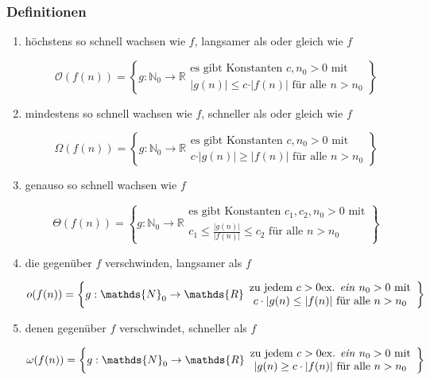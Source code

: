\documentclass{scrartcl}
\begin{document}
\subsubsection{Definitionen}
\begin{enumerate}
	\item höchstens so schnell wachsen wie $f$, {\tiny langsamer als oder gleich wie $f$}
	\begin{shaded}
	\[ \mathcal{O}(f(n)) = \left\lbrace g: \mathds{N}_0 \to \mathds{R}
	\begin{array}{c}
	\textrm{es gibt Konstanten } c,n_0>0 \textrm{ mit} \\
	\vert g(n) \vert \leq c \cdot \vert f(n) \vert \textrm{ für alle } n>n_0
	\end{array}
	\right\rbrace \]
	\end{shaded}
	\item mindestens so schnell wachsen wie $f$, {\tiny schneller als oder gleich wie $f$}
	\begin{shaded}
	\[ \Omega (f(n)) = \left\lbrace g: \mathds{N}_0 \to \mathds{R}
	\begin{array}{c}
	\textrm{es gibt Konstanten } c,n_0>0 \textrm{ mit} \\
	c \cdot \vert g(n) \vert \geq \vert f(n) \vert \textrm{ für alle } n>n_0
	\end{array}
	\right\rbrace \]
	\end{shaded}
	\item genauso so schnell wachsen wie $f$
	\begin{shaded}
	\[ \Theta(f(n)) = \left\lbrace g: \mathds{N}_0 \to \mathds{R}
	\begin{array}{c}
	\textrm{es gibt Konstanten } c_1,c_2,n_0>0 \textrm{ mit} \\
	c_1 \leq \frac{\vert g(n) \vert}{\vert f(n) \vert} \leq c_2 \textrm{ für alle } n>n_0
	\end{array}
	\right\rbrace \]
	\end{shaded}
	\item die gegenüber $f$ verschwinden, {\tiny langsamer als $f$}
	\begin{shaded}
	\[ o(f(n)) = \left\lbrace g: \mathds{N}_0 \to \mathds{R}
	\begin{array}{c}
	\textrm{zu jedem } c>0 \textrm{ex. \emph{ein} } n_0>0 \textrm{ mit} \\
	c \cdot \vert g(n) \leq \vert f(n) \vert \textrm{ für alle } n>n_0
	\end{array}
	\right\rbrace \]
	\end{shaded}
	\item denen gegenüber $f$ verschwindet, {\tiny schneller als $f$}
	\begin{shaded}
	\[ \omega(f(n)) = \left\lbrace g: \mathds{N}_0 \to \mathds{R}
	\begin{array}{c}
	\textrm{zu jedem } c>0 \textrm{ex. \emph{ein} } n_0>0 \textrm{ mit} \\
	\vert g(n) \geq c \cdot \vert f(n) \vert \textrm{ für alle } n>n_0
	\end{array}
	\right\rbrace \]
	\end{shaded}
\end{enumerate}
\end{document}
